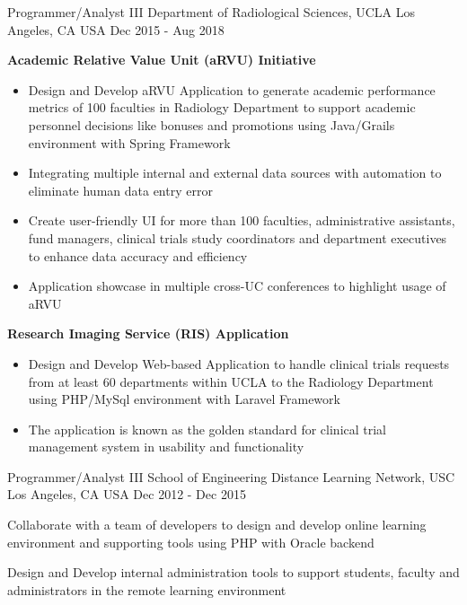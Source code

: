 \begin{cventries}
  \cventry
    {Programmer/Analyst III} %
    {Department of Radiological Sciences, UCLA} %
    {Los Angeles, CA USA} %
    {Dec 2015 - Aug 2018} %
    {
       \begin{cvitems} %
        \item[] { {\bf Academic Relative Value Unit (aRVU) Initiative} 
            \begin{itemize} %
                \item {Design and Develop aRVU Application to generate academic performance metrics of 100 faculties in Radiology Department to support academic personnel decisions like bonuses and promotions using Java/Grails environment with Spring Framework}
                \item {Integrating multiple internal and external data sources with automation to eliminate human data entry error}
                \item {Create user-friendly UI for more than 100 faculties, administrative assistants, fund managers, clinical trials study coordinators and department executives to enhance data accuracy and efficiency}
                \item {Application showcase in multiple cross-UC conferences to highlight usage of aRVU}
              \end{itemize}}
        \item[] {  {\bf Research Imaging Service (RIS) Application}  
            \begin{itemize} %
                \item {Design and Develop Web-based Application to handle clinical trials requests from at least 60 departments within UCLA to the Radiology Department using PHP/MySql environment with Laravel Framework}
                \item {The application is known as the golden standard for clinical trial management system in usability and functionality}
              \end{itemize}}
      \end{cvitems}
    }
	
  \cventry
    {Programmer/Analyst III} %
    {School of Engineering Distance Learning Network, USC} %
    {Los Angeles, CA USA} %
    {Dec 2012 - Dec 2015} %
    {
      \begin{cvitems} %
        \item {Collaborate with a team of developers to design and develop online learning environment and supporting tools using PHP with Oracle backend}
        \item {Design and Develop internal administration tools to support students, faculty and administrators  in the remote learning environment}       
      \end{cvitems}
    }


\end{cventries}
